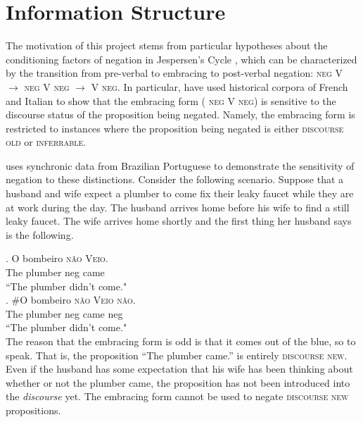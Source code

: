 \section{Information Structure}

The motivation of this project stems from particular hypotheses about the conditioning factors of negation in Jespersen's Cycle \citeyearpar{jespersen:1917}, which can be characterized by the transition from pre-verbal to embracing to post-verbal negation: \textsc{\color{red} neg V} $\rightarrow$ \textsc{\color{blue} neg V neg} $\rightarrow$ \textsc{\color{green} V neg}. In particular, \cite{hansen2009, hansen-visconti2009,hansen-visconti2012} have used historical corpora of French and Italian to show that the embracing form (\textsc{\color{blue} neg V neg}) is sensitive to the discourse status of the proposition being negated. Namely, the embracing form is restricted to instances where the proposition being negated is either \textsc{discourse old} or \textsc{inferrable}.

\cite{schwenter2005,schwenter2006} uses synchronic data from Brazilian Portuguese to demonstrate the sensitivity of negation to these distinctions. Consider the following scenario. Suppose that a husband and wife expect a plumber to come fix their leaky faucet while they are at work during the day. The husband arrives home before his wife to find a still leaky faucet. The wife arrives home shortly and the first thing her husband says is the following.

\exg.  O bombeiro \textsc{\color{red} n{\~a}o} \textsc{\color{red} Veio}.\\
         The plumber neg came\\
         ``The plumber didn't come."\\

\exg. \#O bombeiro \textsc{\color{blue}n{\~a}o} \textsc{\color{blue}Veio} \textsc{\color{blue}n{\~a}o}.\\
	The plumber neg came neg\\
	``The plumber didn't come."\\

The reason that the embracing form is odd is that it comes out of the blue, so to speak. That is, the proposition ``The plumber came.'' is entirely \textsc{discourse new}. Even if the husband has some expectation that his wife has been thinking about whether or not the plumber came, the proposition has not been introduced into the \emph{discourse} yet. The embracing form cannot be used to negate \textsc{discourse new} propositions.


